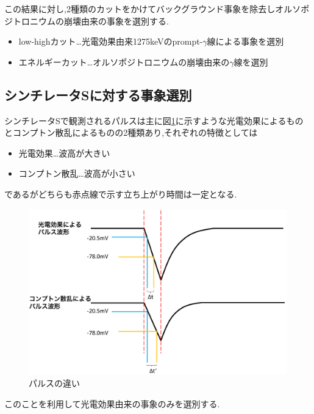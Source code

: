 この結果に対し,2種類のカットをかけてバックグラウンド事象を除去しオルソポジトロニウムの崩壊由来の事象を選別する.
\begin{itemize}
	\item low-highカット…光電効果由来1275keVのprompt-$\gamma$線による事象を選別
	\item エネルギーカット…オルソポジトロニウムの崩壊由来の$\gamma$線を選別
\end{itemize}

\subsection{シンチレータSに対する事象選別}
シンチレータSで観測されるパルスは主に図\ref{fig:pulse_diff}に示すような光電効果によるものとコンプトン散乱によるものの2種類あり,それぞれの特徴としては
\begin{itemize}
	\item 光電効果…波高が大きい
	\item コンプトン散乱…波高が小さい
\end{itemize}
であるがどちらも赤点線で示す立ち上がり時間は一定となる.
\begin{figure}[H]
	\begin{center}
		\includegraphics[width=15cm]{fig/isb/pulse_difference.pdf}
		\caption{パルスの違い}
		\label{fig:pulse_diff}
	\end{center}
\end{figure}
このことを利用して光電効果由来の事象のみを選別する.

